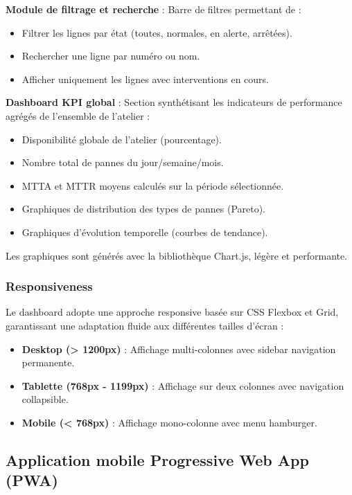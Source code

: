 \textbf{Module de filtrage et recherche} : Barre de filtres permettant de :

\begin{itemize}
    \item Filtrer les lignes par état (toutes, normales, en alerte, arrêtées).
    \item Rechercher une ligne par numéro ou nom.
    \item Afficher uniquement les lignes avec interventions en cours.
\end{itemize}

\textbf{Dashboard KPI global} : Section synthétisant les indicateurs de performance agrégés de l'ensemble de l'atelier :

\begin{itemize}
    \item Disponibilité globale de l'atelier (pourcentage).
    \item Nombre total de pannes du jour/semaine/mois.
    \item MTTA et MTTR moyens calculés sur la période sélectionnée.
    \item Graphiques de distribution des types de pannes (Pareto).
    \item Graphiques d'évolution temporelle (courbes de tendance).
\end{itemize}

Les graphiques sont générés avec la bibliothèque Chart.js, légère et performante.

\subsubsection{Responsiveness}

Le dashboard adopte une approche responsive basée sur CSS Flexbox et Grid, garantissant une adaptation fluide aux différentes tailles d'écran :

\begin{itemize}
    \item \textbf{Desktop (> 1200px)} : Affichage multi-colonnes avec sidebar navigation permanente.
    \item \textbf{Tablette (768px - 1199px)} : Affichage sur deux colonnes avec navigation collapsible.
    \item \textbf{Mobile (< 768px)} : Affichage mono-colonne avec menu hamburger.
\end{itemize}


\subsection{Application mobile Progressive Web App (PWA)}

